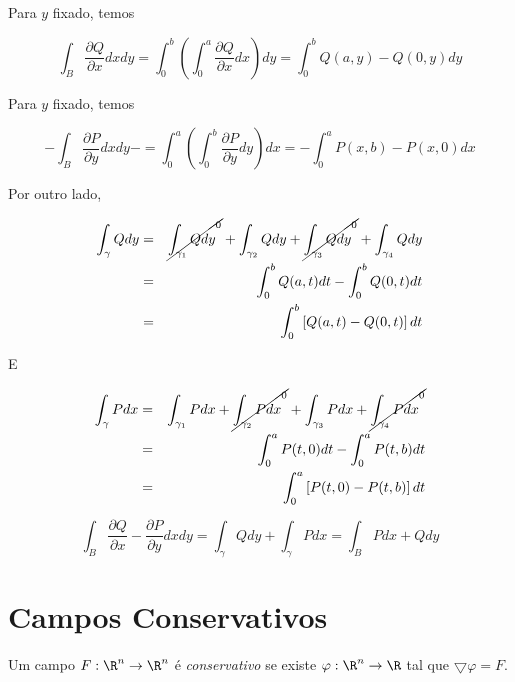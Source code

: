 \documentclass[11pt, oneside, a4paper]{gsm-l}
\begin{document}
\begin{dem}
Para $y$ fixado, temos

\[
\int_B {\frac{{\partial Q}}
{{\partial x}}dxdy}  = \int_0^b {\left( {\int_0^a {\frac{{\partial Q}}
{{\partial x}}dx} } \right)dy}  = \int_0^b {Q(a,y) - Q(0,y)dy} 
\]

Para $y$ fixado, temos

\[
 - \int_B {\frac{{\partial P}}
{{\partial y}}dxdy}  -  = \int_0^a {\left( {\int_0^b {\frac{{\partial P}}
{{\partial y}}dy} } \right)dx}  =  - \int_0^a {P(x,b) - P(x,0)dx} 
\]

Por outro lado,

\begin{eqnarray*}
  \int_\gamma  {Qdy} &=& \cancel{\mathop {\int_{\gamma _1 } {Qdy} }\nolimits^0}  + \int_{\gamma _2 } {Qdy}  + \cancel{\mathop {\int_{\gamma _3 } {Qdy} }\nolimits^0}  + \int_{\gamma _4 } {Qdy}  \hfill \\
   &=& \int_0^b {Q(a,t)dt}  - \int_0^b {Q(0,t)dt}  \hfill \\
   &=& \int_0^b {\left[ {Q(a,t) - Q(0,t)} \right]dt}  \hfill \\ 
\end{eqnarray*}

E

\begin{eqnarray*}
  \int_\gamma  {Pdx} &=& \int_{\gamma _1 } {Pdx} + \cancel{\mathop {\int_{\gamma _2 } {Pdx} }\nolimits^0}  + \int_{\gamma _3 } {Pdx} + \cancel{\mathop {\int_{\gamma _4 } {Pdx} }\nolimits^0}  \hfill \\
   &=& \int_0^a {P(t,0)dt}  - \int_0^a {P(t,b)dt}  \hfill \\
   &=& \int_0^a {\left[ {P(t,0) - P(t,b)} \right]dt}  \hfill \\ 
\end{eqnarray*}

\[
\int_B {\frac{{\partial Q}}
{{\partial x}} - \frac{{\partial P}}
{{\partial y}}dxdy}  = \int_\gamma  {Qdy}  + \int_\gamma  {Pdx}  = \int_B {Pdx + Qdy} 
\]

\end{dem}

\section{Campos Conservativos} \label{sec30}

\begin{defi}
Um campo $F: \R^n \to \R^n$ é \emph{conservativo} se existe $\varphi: \R^n \to \R$ tal que $\bigtriangledown \varphi = F$.
\end{defi}
\end{document}
